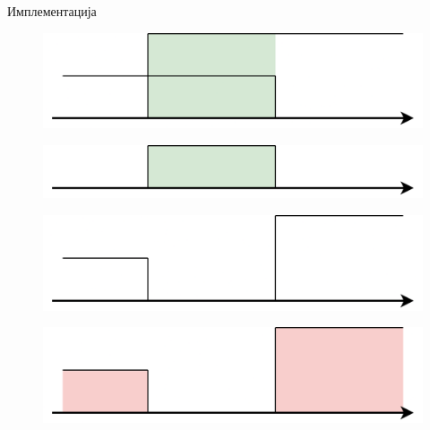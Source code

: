 \documentclass[xcolor=table]{beamer}
\begin{document}
\begin{frame}[allowframebreaks]{Имплементација}
        \framebreak
        
        \begin{figure}
            \centering
            \includegraphics[width=\textwidth,height=0.8\textheight,keepaspectratio]{images/uni_int22.png}
        \end{figure}
        
        \framebreak
        
        \begin{figure}
            \centering
            \includegraphics[width=\textwidth,height=0.8\textheight,keepaspectratio]{images/uni_int23.png}
        \end{figure}
        
        \framebreak
        
        \begin{figure}
            \centering
            \includegraphics[width=\textwidth,height=0.8\textheight,keepaspectratio]{images/uni_int31.png}
        \end{figure}
        
        \framebreak
        
        \begin{figure}
            \centering
            \includegraphics[width=\textwidth,height=0.8\textheight,keepaspectratio]{images/uni_int32.png}
        \end{figure}
        

\end{frame}
\end{document}
